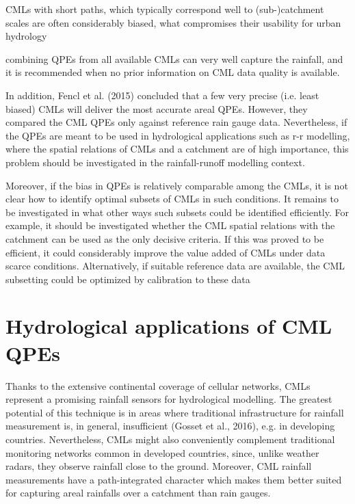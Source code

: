 \documentclass{ctuthesis}\usepackage[]{graphicx}\usepackage[]{color}
\begin{document}
CMLs with short paths, which typically correspond well to (sub-)catchment scales are often considerably biased, what compromises their usability for urban hydrology

combining QPEs from all available CMLs can very well capture the rainfall, and it is recommended when no prior information on CML data quality is available.

In addition, Fencl et al. (2015) concluded that a few very precise (i.e. least biased) CMLs will deliver the most accurate areal QPEs. However, they compared the CML QPEs only against reference rain gauge data. Nevertheless, if the QPEs are meant to be used in hydrological applications such as r-r modelling, where the spatial relations of CMLs and a catchment are of high importance, this problem should be investigated in the rainfall-runoff modelling context.

Moreover, if the bias in QPEs is relatively comparable among the CMLs, it is not clear how to identify optimal subsets of CMLs in such conditions. It remains to be investigated in what other ways such subsets could be identified efficiently. 
For example, it should be investigated whether the CML spatial relations with the catchment can be used as the only decisive criteria. If this was proved to be efficient, it could considerably improve the value added of CMLs under data scarce conditions.
Alternatively, if suitable reference data are available, the CML subsetting could be optimized by calibration to these data





\section{Hydrological applications of CML QPEs}

Thanks to the extensive continental coverage of cellular networks, CMLs represent a promising rainfall sensors for hydrological modelling. The greatest potential of this technique is in areas where traditional infrastructure for rainfall measurement is, in general, insufficient (Gosset et al., 2016), e.g. in developing countries. Nevertheless, CMLs might also conveniently complement traditional monitoring networks common in developed countries, since, unlike weather radars, they observe rainfall close to the ground. Moreover, CML rainfall measurements have a path-integrated character which makes them better suited for capturing areal rainfalls over a catchment than rain gauges. 
\end{document}
